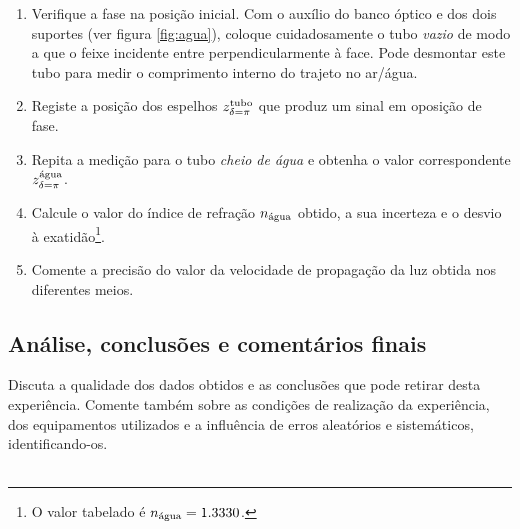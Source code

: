 \documentclass[12pt,a4paper,oneside]{paper}
\begin{document}
    \begin{enumerate}
    \item Verifique a fase na posição inicial. Com o auxílio do banco óptico e dos dois suportes (ver figura \ref{fig:agua}),
    coloque cuidadosamente o tubo \emph{vazio} de modo a que o feixe incidente entre perpendicularmente à face. Pode desmontar
    este tubo para medir o comprimento interno do trajeto no ar/água.
    \item Registe a posição dos espelhos $z_{\delta=\pi}^{\textup{tubo}}$ que produz um sinal em oposição de fase. 
    \item Repita a medição para o tubo \emph{cheio de água} e obtenha o valor correspondente $z_{\delta=\pi}^{\textup{água}}$. 
    \item Calcule o valor do índice de refração $n_{\textup{água}}$ obtido, a sua incerteza e o desvio à
    exatidão\footnote{O valor tabelado é $n_{\textup{água}}=1.3330$.}. 
    \item Comente a precisão do valor da velocidade de propagação da luz obtida nos 
    diferentes meios.
    \end{enumerate}

\subsection{Análise, conclusões e comentários finais}
Discuta a qualidade dos dados obtidos e as conclusões que pode retirar desta experiência. Comente também sobre as condições
de realização da experiência, dos equipamentos utilizados e a influência de erros aleatórios e sistemáticos, identificando-os.\\

\HRule \\[0.5cm]


\newpage
\end{document}
